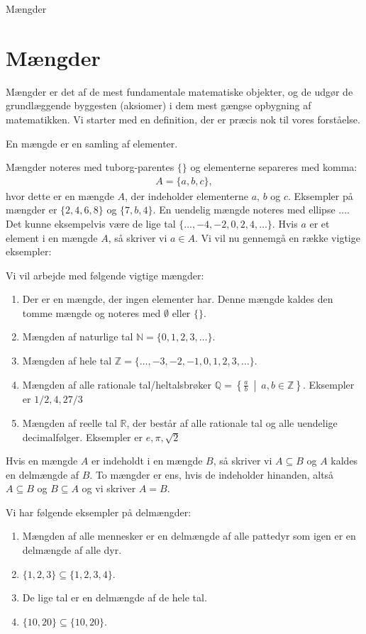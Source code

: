 
\begin{center}
\Huge
Mængder
\end{center}

\section*{Mængder}
Mængder er det af de mest fundamentale matematiske objekter, og de udgør de grundlæggende byggesten (aksiomer) i dem mest gængse opbygning af matematikken. Vi starter med en definition, der er præcis nok til vores forståelse.
\begin{defn}
En mængde er en samling af elementer. 
\end{defn} 
Mængder noteres med tuborg-parentes $\{\}$ og elementerne separeres med komma:
\begin{align*}
	A = \{a,b,c\},
\end{align*}
hvor dette er en mængde $A$, der indeholder elementerne $a$, $b$ og $c$. Eksempler på mængder er $\{2,4,6,8\}$ og $\{7,b,4\}$. En uendelig mængde noteres med ellipse $\hdots$. Det kunne eksempelvis være de lige tal $\{\hdots,-4,-2,0,2,4,\hdots\}$. Hvis $a$ er et element i en mængde $A$, så skriver vi $a\in A$. Vi vil nu gennemgå en række vigtige eksempler:
\begin{exa}
Vi vil arbejde med følgende vigtige mængder:
\begin{enumerate}[label=\roman*)]
\item Der er en mængde, der ingen elementer har. Denne mængde kaldes den tomme mængde og noteres med $\emptyset$ eller $\{\}$. 
\item Mængden af naturlige tal $\mathbb{N} = \{0,1,2,3,\hdots\}$.
\item Mængden af hele tal $\mathbb{Z} = \{\hdots,-3,-2,-1,0,1,2,3,\hdots \}$.
\item Mængden af alle rationale tal/heltalsbrøker $\mathbb{Q} = \left\{\frac{a}{b} \ \middle | \ a,b\in \mathbb{Z}\right\}$. Eksempler er $1/2, 4, 27/3$
\item Mængden af reelle tal $\mathbb{R}$, der består af alle rationale tal og alle uendelige decimalfølger. Eksempler er $e,\pi, \sqrt{2}$
\end{enumerate}
\end{exa}
Hvis en mængde $A$ er indeholdt i en mængde $B$, så skriver vi $A\subseteq B$ og $A$ kaldes en delmængde af $B$. To mængder er ens, hvis de indeholder hinanden, altså $A\subseteq B$ og $B\subseteq A$ og vi skriver $A=B$. 
\begin{exa}
Vi har følgende eksempler på delmængder:
\begin{enumerate}[label=\roman*)]
\item Mængden af alle mennesker er en delmængde af alle pattedyr som igen er en delmængde af alle dyr.
\item $\{1,2,3\} \subseteq \{1,2,3,4\}$.
\item De lige tal er en delmængde af de hele tal.  
\item $\{10,20\}\subseteq \{10,20\}$.
\end{enumerate}
\end{exa}

